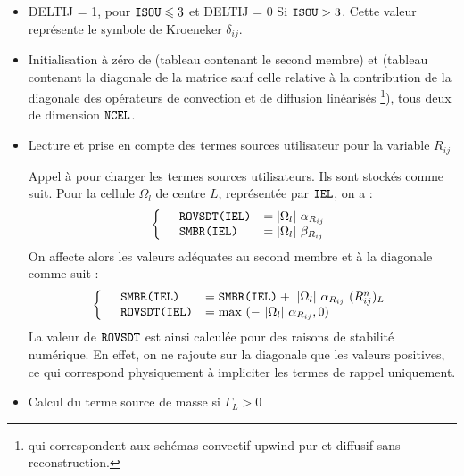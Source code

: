 \begin{itemize}

\item DELTIJ = 1, pour $\text{\texttt{ISOU}} \leqslant 3$ et DELTIJ = 0  Si $\text{\texttt{ISOU}} >
3$. Cette valeur repr\'esente le symbole de Kroeneker $\delta_{ij}$.

\item Initialisation \`a z\'ero de  (tableau contenant le second
membre) et  (tableau contenant la diagonale de la matrice sauf celle
relative \`a la contribution de la
diagonale des op\'erateurs de convection et de diffusion lin\'earis\'es
\footnote{qui correspondent aux sch\'emas convectif upwind pur et diffusif sans
reconstruction.}), tous deux de dimension $\text{\texttt{NCEL}}$.

\item Lecture et prise en compte des termes sources utilisateur pour la variable $R_{ij}$

Appel \`a  pour charger les termes sources utilisateurs. Ils sont
stock\'es comme suit. Pour la cellule $\Omega_l$ de centre $L$, repr\'esent\'ee par $\text{\texttt{IEL}}$, on a :\\
\begin{equation}\notag
\left\{\begin{array}{lll}
&\text{\texttt{ROVSDT(IEL)}}&= |\Omega_l| \ \alpha_{R_{ij}}\\
&\text{\texttt{SMBR(IEL)}}&=|\Omega_l| \ \beta_{R_{ij}}\\
\end{array}\right.
\end{equation}
On affecte alors les valeurs ad\'equates au second membre  et \`a la
diagonale  comme suit :
\begin{equation}\notag
\left\{\begin{array}{lll}
&\var{SMBR(IEL)} &= \var{SMBR(IEL)} +\ |\Omega_l| \ \alpha_{R_{ij}} \ (R^n_{ij})_L \\
&\var{ROVSDT(IEL)}&= \text{max }(-\ |\Omega_l| \ \alpha_{R_{ij}},0)\\
\end{array}\right.
\end{equation}
La valeur de $ \text{\texttt{ROVSDT}}$ est ainsi calcul\'ee pour des raisons de stabilit\'e
num\'erique. En effet, on ne rajoute sur la diagonale que les valeurs positives,
ce qui correspond physiquement \`a impliciter les termes de rappel uniquement.
\item{Calcul du terme source de masse  si $\Gamma_L > 0$}


\end{itemize}
